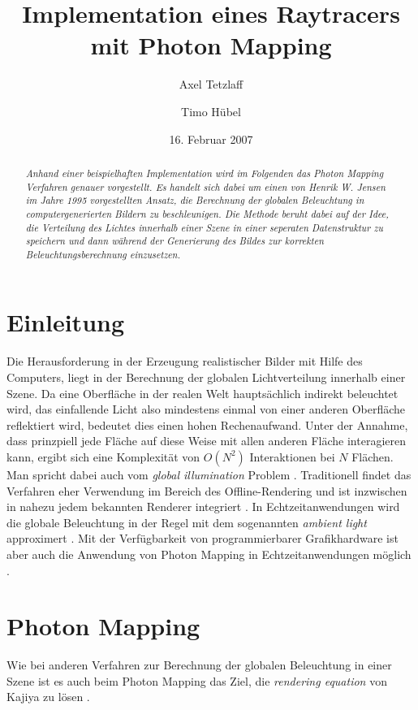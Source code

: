 \documentclass[a4paper,twocolumn,abstracton]{scrartcl}
\begin{document}
\titlehead{\textsc{Fachhochschule Wedel\\Wintersemester 2006/2007}}
\subject{Advanced Graphics}
\title{Implementation eines Raytracers mit Photon Mapping}
\author{Axel Tetzlaff \and Timo Hübel}
\date{16. Februar 2007}
\maketitle

\begin{abstract}
\textit{
Anhand einer beispielhaften Implementation wird im Folgenden das Photon Mapping Verfahren genauer vorgestellt. Es handelt sich dabei um einen von Henrik W. Jensen im Jahre 1995 vorgestellten Ansatz, die Berechnung der globalen Beleuchtung in computergenerierten Bildern zu beschleunigen. Die Methode beruht dabei auf der Idee, die Verteilung des Lichtes innerhalb einer Szene in einer seperaten Datenstruktur zu speichern und dann während der Generierung des Bildes zur korrekten Beleuchtungsberechnung einzusetzen.
}
\end{abstract}

\section{Einleitung}
Die Herausforderung in der Erzeugung realistischer Bilder mit Hilfe des Computers, liegt in der Berechnung der globalen Lichtverteilung innerhalb einer Szene. Da eine Oberfläche in der realen Welt hauptsächlich indirekt beleuchtet wird, das einfallende Licht also mindestens einmal von einer anderen Oberfläche reflektiert wird, bedeutet dies einen hohen Rechenaufwand. Unter der Annahme, dass prinzpiell jede Fläche auf diese Weise mit allen anderen Fläche interagieren kann, ergibt sich eine Komplexität von $O(N^2)$ Interaktionen bei $N$ Flächen. Man spricht dabei auch vom \emph{global illumination} Problem \citep{Shirley2005}. Traditionell findet das Verfahren eher Verwendung im Bereich des Offline-Rendering und ist inzwischen in nahezu jedem bekannten Renderer integriert \citep{Wikipedia2007a}. In Echtzeitanwendungen wird die globale Beleuchtung in der Regel mit dem sogenannten \emph{ambient light} approximert \citep{Shreiner2004}. Mit der Verfügbarkeit von programmierbarer Grafikhardware ist aber auch die Anwendung von Photon Mapping in Echtzeitanwendungen möglich \citep{Purcell2003, Larsen2004}.

\section{Photon Mapping}
Wie bei anderen Verfahren zur Berechnung der globalen Beleuchtung in einer Szene ist es auch beim Photon Mapping das Ziel, die \emph{rendering equation} von Kajiya zu lösen \citep{Jensen2001}.
\end{document}
